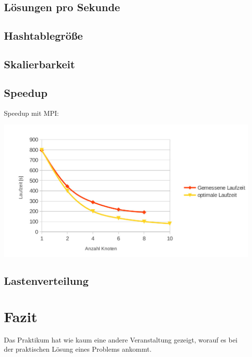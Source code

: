 \documentclass[
	12pt,
	a4paper,
	BCOR10mm,
	DIV14,
	listof=totoc,
	bibliography=totoc,
	headsepline
]{scrreprt}
\begin{document}
\section{Lösungen pro Sekunde}

\section{Hashtablegröße}





\section{Skalierbarkeit}

\section{Speedup}

Speedup mit MPI: 

\includegraphics[scale=0.44]{speedup}

\section{Lastenverteilung}


\chapter{Fazit}
\label{Fazit}


Das Praktikum hat wie kaum eine andere Veranstaltung gezeigt, worauf es bei der praktischen Lösung eines Problems ankommt.
\end{document}
